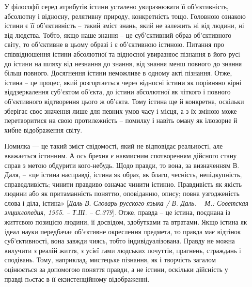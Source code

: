 У філософії серед атрибутів істини усталено увиразнювати її об’єктивність,
абсолютну і відносну, релятивну природу, конкретність тощо. Головною
ознакою істини є її об’єктивність – такий зміст знань, який не залежить ні від
людини, ні від людства. Тобто, якщо наше знання – це суб’єктивний образ
об’єктивного світу, то об’єктивне в цьому образі і є об’єктивною істиною.
Питання про співвідношення істини абсолютної та відносної увиразнює
пізнання в його русі до істини на шляху від незнання до знання, від знання
менш повного до знання більш повного. Досягнення істини неможливе в
одному акті пізнання. Отже, істина – це процес, який розгортається через
відносні істини як порівняно вірні віддзеркалення суб’єктом об’єкта, до істини
абсолютної як чіткого і повного об’єктивного відтворення цього ж об’єкта.
Тому істина ще й конкретна, оскільки зберігає своє значення лише для певних
умов часу і місця, а з їх зміною може перетворитися на свою протилежність –
помилку і навіть оману як ілюзорне й хибне відображення світу.

Помилка --- це такий зміст свідомості, який не відповідає реальності, але
вважається істинним. А ось брехня є навмисним спотворенням дійсного стану
справ з метою обдурити кого-небудь. Щодо правди, то вона, за визначенням В.
Даля, – «це істина насправді, істина як образ, як благо, чесність, непідкупність,
справедливість; чинити правдиво означає чинити істинно. Правдивість як якість
людини або як притаманність поняттю, оповіданню, опису; повна узгодженість
слова і діла, істина» [\textit{Даль В. Словарь русского языка / В. Даль. – М.: Советская
энциклопедия, 1955. – Т.ІІІ. – С.379}]. Отже, правда – це істина, поєднана із
життєвою позицією людини, її досвідом, здобутками та втратами. Якщо істина
як ідеал науки передбачає об’єктивне окреслення предмета, то правда має
відтінок суб’єктивності, вона завжди чиясь, тобто індивідуалізована. Правду не
можна вилучити з реалій життя, з усієї гами людських почуттів, прагнень,
страждань і сподівань. Тому, наприклад, мистецьке пізнання, як і творчість
загалом оцінюється за допомогою поняття правди, а не істини, оскільки
дійсність у правді пoстає в її екзистенційному відображенні.

